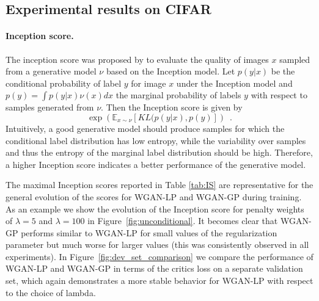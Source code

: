 \documentclass{article} %
\newcommand{\af}[1]{\textcolor{blue}{#1}}
\begin{document}
\subsection{Experimental results on CIFAR}\label{app:realExperiments}

\paragraph{Inception score.}
The inception score was proposed by \citet{iGAN} to evaluate the quality of images $x$ sampled from a generative model $\nu$ based on the Inception model. Let $p(y|x)$ be the conditional probability of label $y$ for image $x$ under the Inception model and $p(y)=\int p(y|x) \nu(x) dx$ the marginal probability of labels  $y$ with respect to samples generated from $\nu$.
Then the Inception score is given by
\begin{equation}
 \exp\left( \mathbb{E}_{x\sim\nu}[KL(p(y|x),p(y)]\right) \enspace.
\end{equation}
Intuitively, a good generative model should produce samples for which the conditional label distribution has low entropy, while the variability over samples and thus the entropy of the marginal label distribution should be high. Therefore, a higher Inception score indicates a better performance of the generative model. 

The maximal Inception scores reported in Table \ref{tab:IS}
are representative for the general evolution of the scores for WGAN-LP and WGAN-GP during training. As an example we show the evolution of the Inception score  for penalty weights of $\lambda=5$ and $\lambda=100$ in Figure~\ref{fig:unconditional}. It becomes clear that WGAN-GP performs similar to WGAN-LP for small values of the regularization parameter but much worse for larger values (this was consistently observed in all experiments). 
In Figure~\ref{fig:dev_set_comparison} we compare the performance of WGAN-LP and WGAN-GP in terms of the critics loss on a separate validation set, which again demonstrates a more stable behavior for WGAN-LP with respect to the choice of lambda. 


\end{document}
